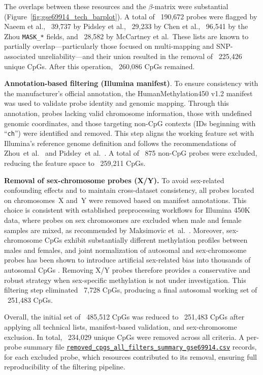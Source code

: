 \documentclass[10pt]{extarticle}
\newcommand{\good}[1]{\textcolor{teal!70!black}{\ding{51}~#1}}
\begin{document}
The overlaps between these resources and the $\beta$-matrix were substantial  
(Figure~\ref{fig:gse69914_tech_barplot}).  
A total of \good{190{,}672 probes} were flagged by Naeem et al., \good{39{,}737} by Pidsley et al.,
\good{29{,}233} by Chen et al., \good{96{,}541} by the Zhou \texttt{MASK\_*} fields, and
\good{28{,}582} by McCartney et al.\  
These lists are known to partially overlap—particularly those focused on multi-mapping and SNP-associated
unreliability—and their union resulted in the removal of \good{225{,}426 unique CpGs}.  
After this operation, \good{260{,}086 CpGs} remained.

\textbf{Annotation-based filtering (Illumina manifest)}.
To ensure consistency with the manufacturer’s official annotation, the HumanMethylation450 v1.2 manifest \cite{Illumina450kManifest} was used to
validate probe identity and genomic mapping.  
Through this annotation, probes lacking valid chromosome information, those with undefined genomic coordinates, and
those targeting non-CpG contexts (IDs beginning with ``\texttt{ch}'') were identified and removed.  
This step aligns the working feature set with Illumina's reference genome definition and follows the recommendations
of Zhou~et al.~\cite{zhou2016} and Pidsley~et al.~\cite{pidsley2016}.  
A total of \good{875 non-CpG probes} were excluded, reducing the feature space to \good{259{,}211 CpGs}.

\textbf{Removal of sex-chromosome probes (X/Y).}
To avoid sex-related confounding effects and to maintain cross-dataset consistency, all probes located on chromosomes~X 
and~Y were removed based on manifest annotations. This choice is consistent with established preprocessing workflows 
for Illumina 450K data, where probes on sex chromosomes are excluded when male and female samples are mixed, as 
recommended by Maksimovic et~al.\ \cite{Maksimovic2012}. Moreover, sex-chromosome CpGs exhibit substantially different 
methylation profiles between males and females, and joint normalization of autosomal and sex-chromosome probes has been 
shown to introduce artificial sex-related bias into thousands of autosomal CpGs \cite{Wang2022InterpolatedXY}. Removing 
X/Y probes therefore provides a conservative and robust strategy when sex-specific methylation is not under investigation. 
This filtering step eliminated \good{7{,}728 CpGs}, producing a final autosomal working set of \good{251{,}483 CpGs}.

Overall, the initial set of \good{485{,}512 CpGs} was reduced to \good{251{,}483 CpGs} after applying all
technical lists, manifest-based validation, and sex-chromosome exclusion.  
In total, \good{234{,}029 unique CpGs} were removed across all criteria.  
A per-probe summary file \href{https://github.com/elisabettaroviera/THESIS/blob/main/05%20-%20CpG%20list/Removed%20CpGs%20per%20Dataset/removed_cpgs_all_filters_summary_gse69914.csv}
{\texttt{removed\_cpgs\_all\_filters\_summary\_gse69914.csv}} records, for each excluded probe,
which resources contributed to its removal, ensuring full reproducibility of the filtering pipeline.  
\end{document}
